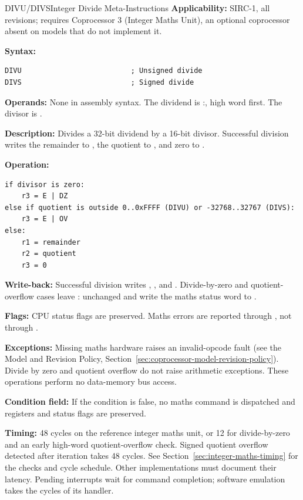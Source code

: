 \begin{instructionbox}{DIVU/DIVS}{Integer Divide Meta-Instructions}
	\textbf{Applicability:} SIRC-1, all revisions; requires Coprocessor 3 (Integer Maths Unit), an optional
	coprocessor absent on models that do not implement it.

	\textbf{Syntax:}
	\begin{lstlisting}
DIVU                          ; Unsigned divide
DIVS                          ; Signed divide
\end{lstlisting}

	\textbf{Operands:} None in assembly syntax. The dividend is :, high word first. The divisor is
	.

	\textbf{Description:} Divides a 32-bit dividend by a 16-bit divisor. Successful division writes the remainder to
	, the quotient to , and zero to .

	\textbf{Operation:}
	\begin{verbatim}
if divisor is zero:
    r3 = E | DZ
else if quotient is outside 0..0xFFFF (DIVU) or -32768..32767 (DIVS):
    r3 = E | OV
else:
    r1 = remainder
    r2 = quotient
    r3 = 0
\end{verbatim}

	\textbf{Write-back:} Successful division writes , , and . Divide-by-zero and
	quotient-overflow cases leave : unchanged and write the maths status word to .

	\textbf{Flags:} CPU status flags are preserved. Maths errors are reported through , not through .

	\textbf{Exceptions:} Missing maths hardware raises an invalid-opcode fault (see the Model and Revision Policy,
	Section~\ref{sec:coprocessor-model-revision-policy}). Divide by
	zero and quotient overflow do not raise arithmetic exceptions. These operations perform no data-memory bus access.

	\textbf{Condition field:} If the condition is false, no maths command is dispatched and registers and status flags are
	preserved.

	\textbf{Timing:} 48 cycles on the reference integer maths unit, or 12 for divide-by-zero and an early
	high-word quotient-overflow check. Signed quotient overflow detected after iteration takes 48 cycles. See
	Section~\ref{sec:integer-maths-timing} for the checks and cycle schedule. Other implementations must document their
	latency. Pending interrupts wait for command completion; software emulation takes the cycles of its handler.


\end{instructionbox}
